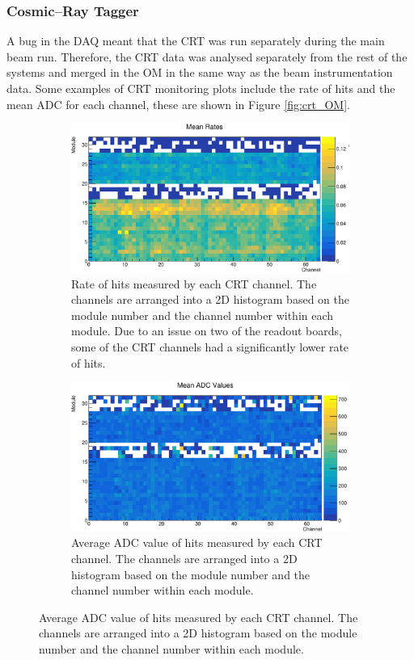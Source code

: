 \subsubsection*{Cosmic--Ray Tagger}
A bug in the DAQ meant that the CRT was run separately during the main beam 
run. Therefore, the CRT data was analysed separately from the rest of the 
\protodune{} systems and merged in the OM in the same way as the beam 
instrumentation data. Some examples of CRT monitoring plots include the rate 
of hits and the mean ADC for each channel, these are shown in Figure 
\ref{fig:crt_OM}.

\begin{figure}

	\centering

	\begin{subfigure}[b]{0.8\textwidth}
		\centering
		\vspace{3mm}
		\includegraphics[width=\textwidth]{figures/crt_rate_om.pdf}
		\caption {Rate of hits measured by each CRT channel. The channels are
		arranged into a 2D histogram based on the module number and the channel
		number within each module. Due to an issue on two of the readout boards,
		some of the CRT channels had a significantly lower rate of hits.}
		\label{fig:crt_rate_om}
	\end{subfigure}

	\begin{subfigure}[b]{0.8\textwidth}
		\centering
		\vspace{3mm}
		\includegraphics[width=\textwidth]{figures/crt_adc_om.pdf}
		\caption {Average ADC value of hits measured by each CRT channel. The 
		channels are arranged into a 2D histogram based on the module number and the 
		channel number within each module.}
		\label{fig:crt_adc_om}
	\end{subfigure}


\end{figure}
